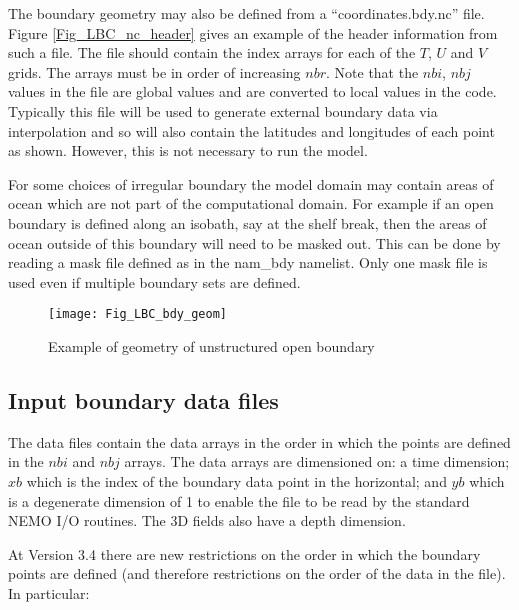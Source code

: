 \documentclass[NEMO_book]{subfiles}
\begin{document}
The boundary geometry may also be defined from a
``coordinates.bdy.nc'' file. Figure \ref{Fig_LBC_nc_header}
gives an example of the header information from such a file. The file
should contain the index arrays for each of the $T$, $U$ and $V$
grids. The arrays must be in order of increasing $nbr$. Note that the
$nbi$, $nbj$ values in the file are global values and are converted to
local values in the code. Typically this file will be used to generate
external boundary data via interpolation and so will also contain the
latitudes and longitudes of each point as shown. However, this is not
necessary to run the model. 

For some choices of irregular boundary the model domain may contain
areas of ocean which are not part of the computational domain. For
example if an open boundary is defined along an isobath, say at the
shelf break, then the areas of ocean outside of this boundary will
need to be masked out. This can be done by reading a mask file defined
as  in the nam\_bdy namelist. Only one mask file is
used even if multiple boundary sets are defined.

\begin{figure}[!t]      \begin{center}
\texttt{[image: Fig\_LBC\_bdy\_geom]}
\caption {      \label{Fig_LBC_bdy_geom}
Example of geometry of unstructured open boundary}
\end{center}   \end{figure}

\subsection{Input boundary data files}
\label{BDY_data}

The data files contain the data arrays
in the order in which the points are defined in the $nbi$ and $nbj$
arrays. The data arrays are dimensioned on: a time dimension;
$xb$ which is the index of the boundary data point in the horizontal;
and $yb$ which is a degenerate dimension of 1 to enable the file to be
read by the standard NEMO I/O routines. The 3D fields also have a
depth dimension. 

At Version 3.4 there are new restrictions on the order in which the
boundary points are defined (and therefore restrictions on the order
of the data in the file). In particular:
\end{document}
